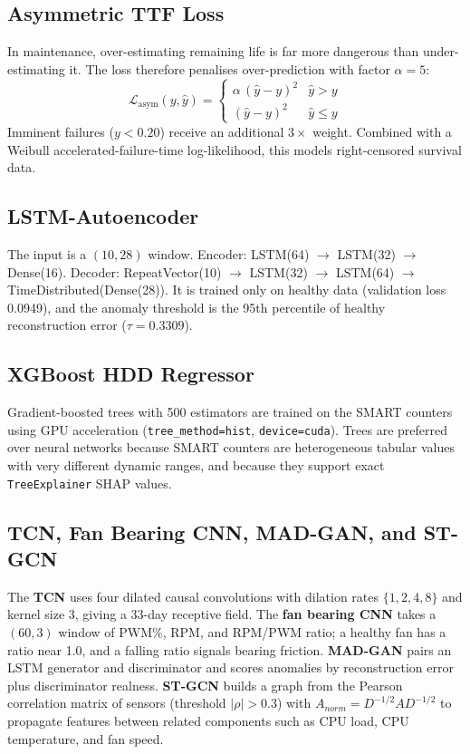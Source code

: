 \documentclass[12pt,a4paper]{report}
\begin{document}
\subsection{Asymmetric TTF Loss}
In maintenance, over-estimating remaining life is far more dangerous than under-estimating it. The loss therefore penalises over-prediction with factor $\alpha=5$:
\begin{equation}\label{eq:asym}
  \mathcal{L}_{\text{asym}}(y,\hat y)=\begin{cases}\alpha\,(\hat y-y)^2 & \hat y>y\\ (\hat y-y)^2 & \hat y\le y\end{cases}
\end{equation}
Imminent failures ($y<0.20$) receive an additional $3\times$ weight. Combined with a Weibull accelerated-failure-time log-likelihood, this models right-censored survival data.

\subsection{LSTM-Autoencoder}
The input is a $(10,28)$ window. Encoder: LSTM(64) $\rightarrow$ LSTM(32) $\rightarrow$ Dense(16). Decoder: RepeatVector(10) $\rightarrow$ LSTM(32) $\rightarrow$ LSTM(64) $\rightarrow$ TimeDistributed(Dense(28)). It is trained only on healthy data (validation loss 0.0949), and the anomaly threshold is the 95th percentile of healthy reconstruction error ($\tau=0.3309$).

\subsection{XGBoost HDD Regressor}
Gradient-boosted trees with 500 estimators are trained on the SMART counters using GPU acceleration (\texttt{tree\_method=hist}, \texttt{device=cuda}). Trees are preferred over neural networks because SMART counters are heterogeneous tabular values with very different dynamic ranges, and because they support exact \texttt{TreeExplainer} SHAP values.

\subsection{TCN, Fan Bearing CNN, MAD-GAN, and ST-GCN}
The \textbf{TCN} uses four dilated causal convolutions with dilation rates $\{1,2,4,8\}$ and kernel size 3, giving a 33-day receptive field. The \textbf{fan bearing CNN} takes a $(60,3)$ window of PWM\%, RPM, and RPM/PWM ratio; a healthy fan has a ratio near 1.0, and a falling ratio signals bearing friction. \textbf{MAD-GAN} pairs an LSTM generator and discriminator and scores anomalies by reconstruction error plus discriminator realness. \textbf{ST-GCN} builds a graph from the Pearson correlation matrix of sensors (threshold $|\rho|>0.3$) with $A_{norm}=D^{-1/2}AD^{-1/2}$ to propagate features between related components such as CPU load, CPU temperature, and fan speed.
\end{document}
